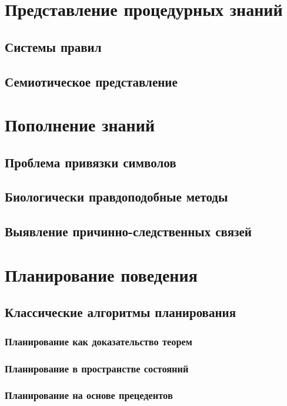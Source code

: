 \documentclass[b5paper,11pt]{book}
\begin{document}
	\chapter{Представление процедурных знаний}
	
	\section{Системы правил}
	\section{Семиотическое представление}
	


	\chapter{Пополнение знаний}
	
	\section{Проблема привязки символов}
	\section{Биологически правдоподобные методы}
	\section{Выявление причинно-следственных связей}
	
	
	
	\chapter{Планирование поведения}
	
	\section{Классические алгоритмы планирования}
	\subsection{Планирование как доказательство теорем}
	\subsection{Планирование в пространстве состояний}
	\subsection{Планирование на основе прецедентов}
	
\end{document}
